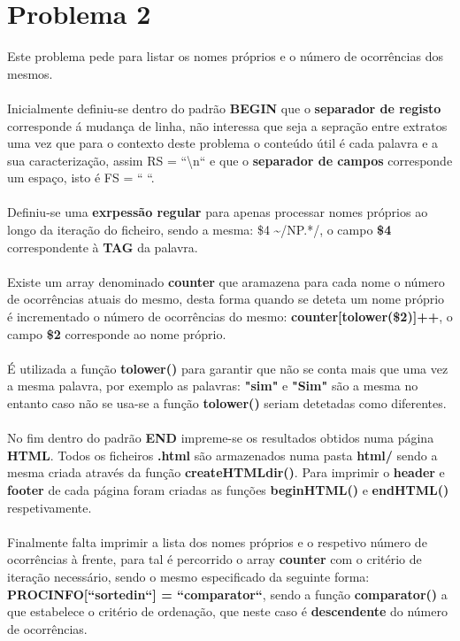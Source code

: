 \documentclass[11pt,a4paper]{report}%
\begin{document}
\section{Problema 2}
Este problema pede para listar os nomes próprios e o número de ocorrências dos mesmos. 
\\\\
Inicialmente definiu-se dentro do padrão \textbf{BEGIN} que o \textbf{separador de registo} corresponde á mudança de linha, não interessa que seja a sepração entre extratos uma vez que para o contexto deste problema o conteúdo útil é cada palavra e a sua caracterização, assim RS = ``\textbackslash n`` e que o \textbf{separador de campos} corresponde um espaço, isto é FS = `` ``.
\\\\
Definiu-se uma \textbf{exrpessão regular} para apenas processar nomes próprios ao longo da iteração do ficheiro, sendo a mesma: \$4 \textasciitilde/NP.*/, o campo \textbf{\$4} correspondente à \textbf{TAG} da palavra.
\\\\
Existe um array denominado \textbf{counter} que aramazena para cada nome o número de ocorrências atuais do mesmo, desta forma quando se deteta um nome próprio é incrementado o número de ocorrências do mesmo: \textbf{counter[tolower(\$2)]++}, o campo \textbf{\$2} corresponde ao nome próprio. 
\\\\
É utilizada a função \textbf{tolower()} para garantir que não se conta mais que uma vez a mesma palavra, por exemplo as palavras: \textbf{"sim"} e \textbf{"Sim"} são a mesma no entanto caso não se usa-se a função \textbf{tolower()} seriam detetadas como diferentes.
\\\\
No fim dentro do padrão \textbf{END} impreme-se os resultados obtidos numa página \textbf{HTML}. Todos os ficheiros \textbf{.html} são armazenados numa pasta \textbf{html/} sendo a mesma criada através da função \textbf{createHTMLdir()}. Para imprimir o \textbf{header} e \textbf{footer} de cada página foram criadas as funções \textbf{beginHTML()} e \textbf{endHTML()} respetivamente.
\\\\
Finalmente falta imprimir a lista dos nomes próprios e o respetivo número de ocorrências à frente, para tal é percorrido o array \textbf{counter} com o critério de iteração necessário, sendo o mesmo especificado da seguinte forma: \textbf{PROCINFO[``sorted\textunderscore in``] = ``comparator``}, sendo a função \textbf{comparator()} a que estabelece o critério de ordenação, que neste caso é \textbf{descendente} do número de ocorrências.
\newpage 
\end{document}
